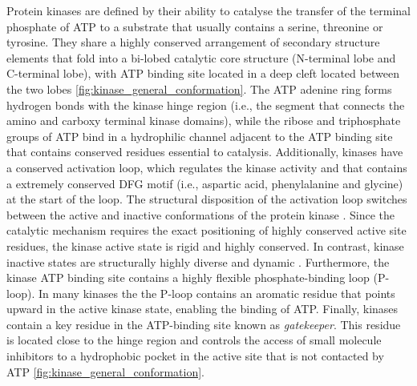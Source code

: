 \documentclass[12pt, b5paper,twoside]{tesi_upf}
\begin{document}
 \par Protein kinases are defined by their ability to catalyse the transfer of the terminal phosphate of ATP to a substrate that usually contains a serine, threonine or tyrosine. They share a highly conserved arrangement of secondary structure elements that fold into a bi-lobed catalytic core structure (N-terminal lobe and C-terminal lobe), with ATP binding site located in a deep cleft located between the two lobes \cite{Manning2002} \ref{fig:kinase_general_conformation}. The ATP adenine ring forms hydrogen bonds with the kinase hinge region (i.e., the segment that connects the amino and carboxy terminal kinase domains), while the ribose and triphosphate groups of ATP bind in a hydrophilic channel adjacent to the ATP binding site that contains conserved residues essential to catalysis. Additionally, kinases have a conserved activation loop, which regulates the kinase activity and that contains a extremely conserved DFG motif (i.e., aspartic acid, phenylalanine and glycine) at the start of the loop. The structural disposition of the activation loop switches between the active and inactive conformations of the protein kinase \cite{Manning2002}. Since the catalytic mechanism requires the exact positioning of highly conserved active site residues, the kinase active state is rigid and highly conserved. In contrast, kinase inactive states are structurally highly diverse and dynamic \cite{Muller2015}. Furthermore, the kinase ATP binding site contains a highly flexible phosphate-binding loop (P-loop). In many kinases the the P-loop contains an aromatic residue that points upward in the active kinase state, enabling the binding of ATP. Finally, kinases contain a key residue in the ATP-binding site known as \textit{gatekeeper}. This residue is located close to the hinge region and controls the access of small molecule inhibitors to a hydrophobic pocket in the active site that is not contacted by ATP \cite{Lui1998} \ref{fig:kinase_general_conformation}.  
 
\end{document}
